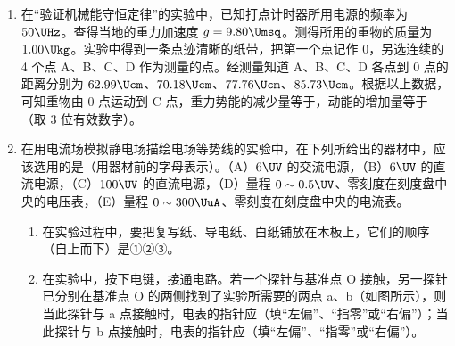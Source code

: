 \documentclass[\gkver]{gaokaozhenti}
\begin{document}
\begin{enumerate}
\item
在“验证机械能守恒定律”的实验中，已知打点计时器所用电源的频率为 $50\UHz$。查得当地的重力加速度 $g = 9.80\Umsq$。测得所用的重物的质量为 $1.00\Ukg$。实验中得到一条点迹清晰的纸带，把第一个点记作 0，另选连续的 4 个点 A、B、C、D 作为测量的点。经测量知道 A、B、C、D 各点到 0 点的距离分别为 $62.99\Ucm$、$70.18\Ucm$、$77.76\Ucm$、$85.73\Ucm$。根据以上数据，可知重物由 0 点运动到 C 点，重力势能的减少量等于\tkanswer[1.8cm]{$7.62\UJ$}，动能的增加量等于\tkanswer[1.8cm]{$7.56\UJ$}（取 3 位有效数字）。

\item
在用电流场模拟静电场描绘电场等势线的实验中，在下列所给出的器材中，应该选用的是（用器材前的字母表示）。（A）$6\UV$ 的交流电源，（B）$6\UV$ 的直流电源，（C）$100\UV$ 的直流电源，（D）量程 $0\sim0.5\UV$、零刻度在刻度盘中央的电压表，（E）量程 $0\sim300\UuA$、零刻度在刻度盘中央的电流表。

\begin{enumerate}
	\item
	在实验过程中，要把复写纸、导电纸、白纸铺放在木板上，它们的顺序（自上而下）是①②③。
	\item
	在实验中，按下电键，接通电路。若一个探针与基准点 O 接触，另一探针已分别在基准点 O 的两侧找到了实验所需要的两点 a、b（如图所示），则当此探针与 a 点接触时，电表的指针应（填“左偏”、“指零”或“右偏”）；当此探针与 b 点接触时，电表的指针应（填“左偏”、“指零”或“右偏”）。
\end{enumerate}
\end{enumerate}
\end{document}
